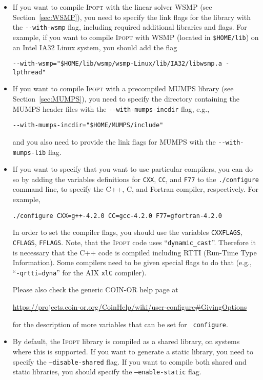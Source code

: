 \documentclass[10pt]{article}
\newcommand{\Ipopt}{\textsc{Ipopt}\xspace}
\begin{document}
\begin{itemize}
\item If you want to compile \Ipopt with the linear solver WSMP (see
  Section~\ref{sec:WSMP}), you need to specify the link flags for the
  library with the \verb|--with-wsmp| flag, including required
  additional libraries and flags.  For example, if you want to compile
  \Ipopt with WSMP (located in {\tt \$HOME/lib}) on an Intel IA32
  Linux system, you should add the flag

  \verb|--with-wsmp="$HOME/lib/wsmp/wsmp-Linux/lib/IA32/libwsmp.a -lpthread"| %

\item If you want to compile \Ipopt with a precompiled MUMPS library
  (see Section~\ref{sec:MUMPS}), you need to specify the directory containing
  the MUMPS header files with the \verb|--with-mumps-incdir| flag,
  e.g.,

  \verb|--with-mumps-incdir="$HOME/MUMPS/include"|  %

  and you also need to provide the link flags for MUMPS with the
  \verb|--with-mumps-lib| flag.

\item If you want to specify that you want to use particular
  compilers, you can do so by adding the variables definitions for
  {\tt CXX}, {\tt CC}, and {\tt F77} to the {\tt ./configure} command
  line, to specify the C++, C, and Fortran compiler, respectively.
  For example,

  {\tt ./configure CXX=g++-4.2.0 CC=gcc-4.2.0 F77=gfortran-4.2.0}

  In order to set the compiler flags, you should use the variables
  {\tt CXXFLAGS}, {\tt CFLAGS}, {\tt FFLAGS}.  Note, that the \Ipopt
  code uses ``{\tt dynamic\_cast}''.  Therefore it is necessary that
  the C++ code is compiled including RTTI (Run-Time Type Information).
  Some compilers need to be given special flags to do that (e.g.,
  ``{\tt -qrtti=dyna}'' for the AIX {\tt xlC} compiler).

  Please also check the generic COIN-OR help page at

  \centerline{\url{https://projects.coin-or.org/CoinHelp/wiki/user-configure\#GivingOptions}}

  for the description of more variables that can be set for {\tt
    configure}.

\item By default, the \Ipopt library is compiled as a shared library,
  on systems where this is supported.  If you want to generate a
  static library, you need to specify the {\tt --disable-shared}
  flag.  If you want to compile both shared and static libraries, you
  should specify the {\tt --enable-static} flag.


\end{itemize}
\end{document}
